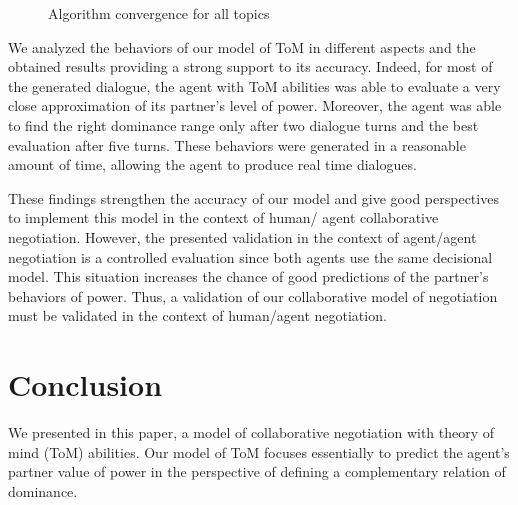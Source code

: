 \documentclass[sigconf]{aamas}  %
\begin{document}
	\begin{figure}[]
		\caption{Algorithm convergence for all topics} 
		\label{fig:time}
	\end{figure}

	We analyzed the behaviors of our model of ToM in different aspects and the obtained results providing a strong support to its accuracy. Indeed, for most of the generated dialogue, the agent with ToM abilities was able to evaluate a very close approximation of its partner's level of power. Moreover, the agent was able to find the right dominance range only after two dialogue turns and the best evaluation after five turns. These behaviors were generated in a reasonable amount of time, allowing the agent to produce real time dialogues.

	
	 These findings strengthen the accuracy of our model and give good perspectives to implement this model in the context of human/ agent collaborative negotiation. However, the presented validation in the context of agent/agent negotiation is a controlled evaluation since both agents use the same decisional model. This situation increases the chance of good predictions of the partner's behaviors of power. 	Thus, a validation of our collaborative model of negotiation must be validated in the context of human/agent negotiation.
	 
	\section{Conclusion}
	
		We presented in this paper, a model of collaborative negotiation with theory of mind (ToM) abilities. Our model of ToM focuses essentially to predict the agent's partner value of power in the perspective of defining a complementary relation of dominance.
\end{document}
